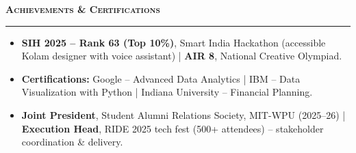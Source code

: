 \documentclass[a4paper,10pt]{article}
\newcommand{\sectionHeader}[2]{%
  \vspace{3.5pt}%
  \noindent%
  {\normalsize\bfseries\color{HeaderDark}#2\enspace\textsc{#1}}%
  \\[-6pt]%
  {\color{SectionLine}\rule{\textwidth}{1pt}}%
  \vspace{1pt}\par%
}
\begin{document}

\sectionHeader{Achievements \& Certifications}{\faTrophy}

\begin{itemize}[leftmargin=14pt, itemsep=0pt, parsep=0pt, topsep=1pt, label={\color{BulletColor}$\bullet$}]
  \item {\small \textbf{SIH 2025 -- Rank 63 (Top 10\%)}, Smart India Hackathon (accessible Kolam designer with voice assistant) {\color{SubText}|} \textbf{AIR 8}, National Creative Olympiad.}
  \item {\small \textbf{Certifications:} Google -- Advanced Data Analytics {\color{SubText}|} IBM -- Data Visualization with Python {\color{SubText}|} Indiana University -- Financial Planning.}
  \item {\small \textbf{Joint President}, Student Alumni Relations Society, MIT-WPU (2025--26) {\color{SubText}|} \textbf{Execution Head}, RIDE 2025 tech fest (500+ attendees) -- stakeholder coordination \& delivery.}
\end{itemize}

\end{document}
